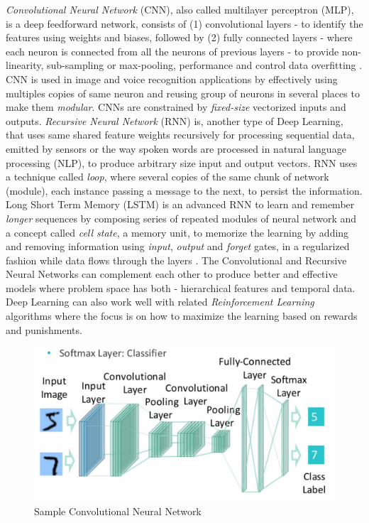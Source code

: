 \documentclass[sigconf]{acmart}
\begin{document}
	{\em Convolutional Neural Network} (CNN), also called multilayer perceptron (MLP), is a deep feedforward network, consists of (1) convolutional layers - to identify the features using weights and biases, followed by (2) fully connected layers - where each neuron is connected from all the neurons of previous layers - to provide non-linearity, sub-sampling or max-pooling, performance and control data overfitting \cite{ChristopherOlah2014}. CNN is used in image and voice recognition applications by effectively using multiples copies of same neuron and reusing group of neurons in several places to make them {\em modular}. CNNs are constrained by {\em fixed-size} vectorized inputs and outputs. {\em Recursive Neural Network} (RNN) is, another type of Deep Learning, that uses same shared feature weights recursively for processing sequential data, emitted by sensors or the way spoken words are processed in natural language processing (NLP), to produce arbitrary size input and output vectors. RNN uses a technique called {\em loop}, where several copies of the same chunk of network (module), each instance passing a message to the next, to persist the information. Long Short Term Memory (LSTM) is an advanced RNN to learn and remember {\em longer} sequences by composing series of repeated modules of neural network and a concept called {\em cell state}, a memory unit, to memorize the learning by adding and removing information using {\em input}, {\em output} and {\em forget} gates, in a regularized fashion while data flows through the layers \cite{Olah2015}. The Convolutional and Recursive Neural Networks can complement each other to produce better and effective models where problem space has both - hierarchical features and temporal data. Deep Learning can also work well with related {\em Reinforcement Learning} algorithms where the focus is on how to maximize the learning based on rewards and punishments.	

	\begin{figure}
		\centering
		\includegraphics[width=1.0\columnwidth]{images/cnn}
		\caption{Sample Convolutional Neural Network \cite{Chang2016}} \label{fig:figure3} 
	\end{figure}
\end{document}
